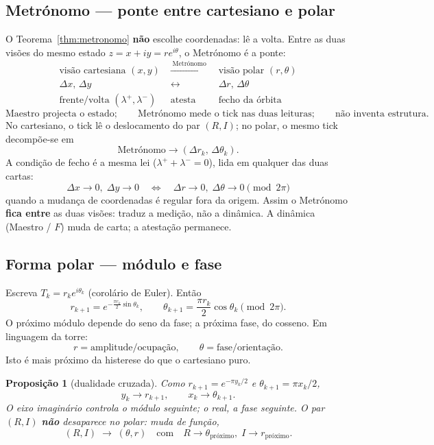\documentclass[11pt,a4paper]{article}
\newtheorem{proposicao}{Proposição}
\begin{document}
\subsection*{Metrónomo --- ponte entre cartesiano e polar}\label{sec:metronomo-ponte}

O Teorema~\ref{thm:metronomo} \textbf{não} escolhe coordenadas: lê a
volta. Entre as duas visões do mesmo estado $z=x+iy=re^{i\theta}$, o
Metrónomo é a ponte:
\[
\boxed{
\begin{array}{ccc}
\text{visão cartesiana }(x,y)
&\;\xrightarrow{\;\text{Metrónomo}\;}\;
&
\text{visão polar }(r,\theta)
\\
\Delta x,\,\Delta y
&\;\longleftrightarrow\;
&
\Delta r,\,\Delta\theta
\\
\text{frente/volta }(\lambda^{+},\lambda^{-})
&\;\text{atesta}\;
&
\text{fecho da órbita}
\end{array}
}
\]
\[
\boxed{
\text{Maestro projecta o estado};
\qquad
\text{Metrónomo mede o tick nas duas leituras};
\qquad
\text{não inventa estrutura}.
}
\]
No cartesiano, o tick lê o deslocamento do par $(R,I)$; no polar, o
mesmo tick decompõe-se em
\[
\boxed{\text{Metrónomo}\longrightarrow(\Delta r_k,\,\Delta\theta_k)}.
\]
A condição de fecho é a mesma lei ($\lambda^{+}+\lambda^{-}=0$), lida
em qualquer das duas cartas:
\[
\boxed{
\Delta x\to0,\;\Delta y\to0
\quad\Longleftrightarrow\quad
\Delta r\to0,\;\Delta\theta\to0\pmod{2\pi}
}
\]
quando a mudança de coordenadas é regular fora da origem. Assim o
Metrónomo \textbf{fica entre} as duas visões: traduz a medição, não a
dinâmica. A dinâmica (Maestro / $F$) muda de carta; a atestação
permanece.

\subsection*{Forma polar --- módulo e fase}

Escreva $T_k=r_k e^{i\theta_k}$ (corolário de Euler). Então
\[
\boxed{
r_{k+1}=e^{-\frac{\pi r_k}{2}\sin\theta_k},
\qquad
\theta_{k+1}=\frac{\pi r_k}{2}\cos\theta_k\pmod{2\pi}.
}
\]
O próximo módulo depende do seno da fase; a próxima fase, do cosseno.
Em linguagem da torre:
\[
\boxed{r=\text{amplitude/ocupação},
\qquad
\theta=\text{fase/orientação}.}
\]
Isto é mais próximo da histerese do que o cartesiano puro.

\begin{proposicao}[dualidade cruzada]\label{prop:cruzada}
Como $r_{k+1}=e^{-\pi y_k/2}$ e $\theta_{k+1}=\pi x_k/2$,
\[
\boxed{y_k\to r_{k+1},
\qquad
x_k\to\theta_{k+1}.}
\]
O eixo imaginário controla o módulo seguinte; o real, a fase seguinte.
O par $(R,I)$ \textbf{não} desaparece no polar: muda de função,
\[
\boxed{(R,I)\;\longrightarrow\;(\theta,r)}
\quad\text{com}\quad
R\to\theta_{\mathrm{próximo}},\;
I\to r_{\mathrm{próximo}}.
\]
\end{proposicao}
\end{document}
